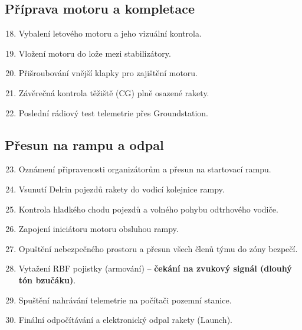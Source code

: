 \documentclass[a4paper,12pt]{article}
\begin{document}
\subsection*{Příprava motoru a kompletace}
\begin{enumerate}
    \setcounter{enumi}{17}
    \item Vybalení letového motoru a jeho vizuální kontrola.
    \item Vložení motoru do lože mezi stabilizátory.
    \item Přišroubování vnější klapky pro zajištění motoru.
    \item Závěrečná kontrola těžiště (CG) plně osazené rakety.
    \item Poslední rádiový test telemetrie přes Groundstation.
\end{enumerate}

\subsection*{Přesun na rampu a odpal}
\begin{enumerate}
    \setcounter{enumi}{22}
    \item Oznámení připravenosti organizátorům a přesun na startovací rampu.
    \item Vsunutí Delrin pojezdů rakety do vodicí kolejnice rampy.
    \item Kontrola hladkého chodu pojezdů a volného pohybu odtrhového vodiče.
    \item Zapojení iniciátoru motoru obsluhou rampy.
    \item Opuštění nebezpečného prostoru a přesun všech členů týmu do zóny bezpečí.
    \item Vytažení RBF pojistky (armování) -- \textbf{čekání na zvukový signál (dlouhý tón bzučáku)}.
    \item Spuštění nahrávání telemetrie na počítači pozemní stanice.
    \item Finální odpočítávání a elektronický odpal rakety (Launch).
\end{enumerate}
\end{document}

